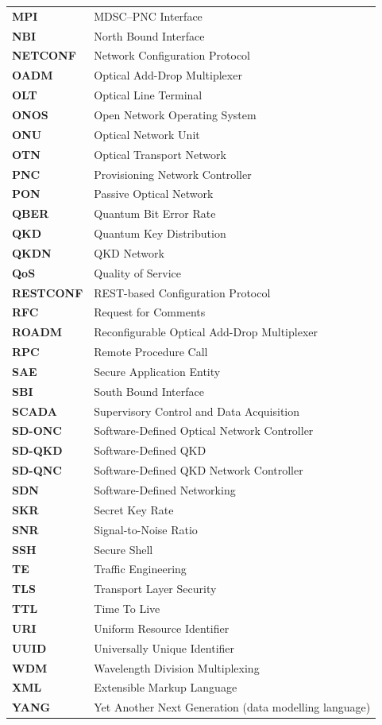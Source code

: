 \begin{longtable}{@{}p{2.6cm}p{12.6cm}@{}}
\textbf{MPI} & MDSC--PNC Interface \\
\textbf{NBI} & North Bound Interface \\
\textbf{NETCONF} & Network Configuration Protocol \\
\textbf{OADM} & Optical Add-Drop Multiplexer \\
\textbf{OLT} & Optical Line Terminal \\
\textbf{ONOS} & Open Network Operating System \\
\textbf{ONU} & Optical Network Unit \\
\textbf{OTN} & Optical Transport Network \\
\textbf{PNC} & Provisioning Network Controller \\
\textbf{PON} & Passive Optical Network \\
\textbf{QBER} & Quantum Bit Error Rate \\
\textbf{QKD} & Quantum Key Distribution \\
\textbf{QKDN} & QKD Network \\
\textbf{QoS} & Quality of Service \\
\textbf{RESTCONF} & REST-based Configuration Protocol \\
\textbf{RFC} & Request for Comments \\
\textbf{ROADM} & Reconfigurable Optical Add-Drop Multiplexer \\
\textbf{RPC} & Remote Procedure Call \\
\textbf{SAE} & Secure Application Entity \\
\textbf{SBI} & South Bound Interface \\
\textbf{SCADA} & Supervisory Control and Data Acquisition \\
\textbf{SD-ONC} & Software-Defined Optical Network Controller \\
\textbf{SD-QKD} & Software-Defined QKD \\
\textbf{SD-QNC} & Software-Defined QKD Network Controller \\
\textbf{SDN} & Software-Defined Networking \\
\textbf{SKR} & Secret Key Rate \\
\textbf{SNR} & Signal-to-Noise Ratio \\
\textbf{SSH} & Secure Shell \\
\textbf{TE} & Traffic Engineering \\
\textbf{TLS} & Transport Layer Security \\
\textbf{TTL} & Time To Live \\
\textbf{URI} & Uniform Resource Identifier \\
\textbf{UUID} & Universally Unique Identifier \\
\textbf{WDM} & Wavelength Division Multiplexing \\
\textbf{XML} & Extensible Markup Language \\
\textbf{YANG} & Yet Another Next Generation (data modelling language) \\
\end{longtable}
